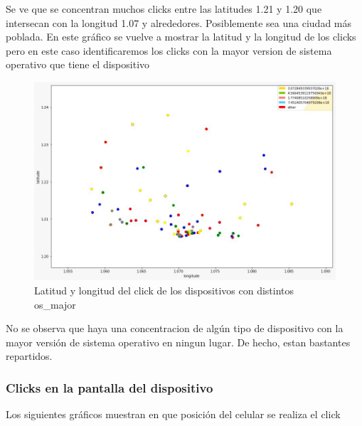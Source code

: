 \documentclass[a4paper, 12pt]{article}
\begin{document}
		 Se ve que se concentran muchos clicks entre las latitudes 1.21 y 1.20 que intersecan con la longitud 1.07 y alrededores. Posiblemente sea una ciudad más poblada.
		\newline
		\newline
		\newline
		\newline
		\newline
		 En este gráfico se vuelve a mostrar la latitud y la longitud de los clicks pero en este caso identificaremos los clicks con la mayor version de sistema operativo que tiene el dispositivo
		

		\begin{figure}[H]
			\centering
			\includegraphics[width=\textwidth]{images/clicks/clicks_lat_long_major_OS.png}
			\caption{Latitud y longitud del click de los dispositivos con distintos os\_major}
		\end{figure}


		 No se observa que haya una concentracion de algún tipo de dispositivo con la mayor versión de sistema operativo en ningun lugar. De hecho, estan bastantes repartidos.

	\subsubsection{Clicks en la pantalla del dispositivo}

		 Los siguientes gráficos muestran en que posición del celular se realiza el click
\end{document}
